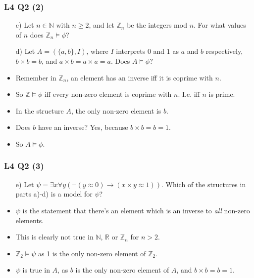 \documentclass[handout]{beamer}
\newcommand{\bN}{\mathbb{N}}
\newcommand{\bZ}{\mathbb{Z}}
\newcommand{\bR}{\mathbb{R}}
\begin{document}
\begin{frame}
\frametitle{L4 Q2 (2)}
\begin{enumerate}[]
\item[c)] Let $n\in\bN$ with $n\geq 2$, and let $\bZ_n$ be the integers mod $n$. For what values of $n$ does $\bZ_n\models \phi$? 
\item[d)] Let $A=(\{a,b\},I)$, where $I$ interprets $0$ and $1$ as $a$ and $b$ respectively, $b\times b = b$, and $a\times b = a\times a = a$. Does $A\models \phi$?
\end{enumerate} 
\vspace{0.5cm}
\begin{itemize}
\item Remember in $\bZ_n$, an element has an inverse iff it is coprime with $n$. 
\item So $\bZ\models \phi$ iff every non-zero element is coprime with $n$. I.e. iff $n$ is prime.\vspace{0.3cm}
\item In the structure $A$, the only non-zero element is $b$.
\item Does $b$ have an inverse? Yes, because $b\times b = b = 1$. 
\item So $A\models \phi$.
\end{itemize}
\end{frame}

\begin{frame}
\frametitle{L4 Q2 (3)}
\begin{enumerate}[]
\item[e)] Let $\psi= \exists x \forall y(\neg (y\approx 0)\rightarrow (x\times y \approx 1))$. Which of the structures in parts a)-d) is a model for $\psi$? 
\end{enumerate} 
\vspace{0.5cm}
\begin{itemize}
\item $\psi$ is the statement that there's an element which is an inverse to \emph{all} non-zero elements.\vspace{0.3cm}
\item This is clearly not true in $\bN$, $\bR$ or $\bZ_n$ for $n>2$.\vspace{0.3cm}
\item $\bZ_2\models \psi$ as 1 is the only non-zero element of $\bZ_2$.\vspace{0.3cm}
\item $\psi$ is true in $A$, as $b$ is the only non-zero element of $A$, and $b\times b = b = 1$.
\end{itemize}
\end{frame}
\end{document}
